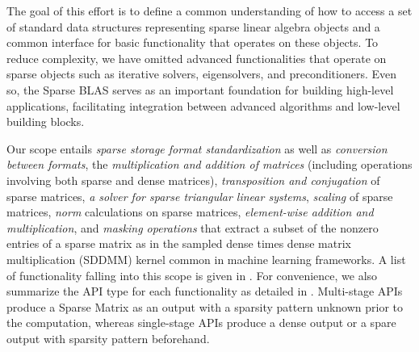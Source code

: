 \documentclass{article}
\begin{document}
The goal of this effort is to define a common understanding of how to access a set of standard data structures representing sparse linear algebra objects and a common interface for basic functionality that operates on these objects.
To reduce complexity, we have omitted advanced functionalities that operate on sparse objects such as iterative solvers, eigensolvers, and preconditioners. Even so, the Sparse BLAS serves as an important foundation for building high-level applications, facilitating integration between advanced algorithms and low-level building blocks.

Our scope entails \textit{sparse storage format standardization} as well as \textit{conversion between formats}, the \textit{multiplication and addition of matrices} (including operations involving both sparse and dense matrices), \textit{transposition and conjugation} of sparse matrices, \textit{a solver for sparse triangular linear systems}, \textit{scaling} of sparse matrices, \textit{norm} calculations on sparse matrices, \textit{element-wise addition and multiplication}, and \textit{masking operations} that extract a subset of the nonzero entries of a sparse matrix as in the sampled dense times dense matrix multiplication (SDDMM) kernel common in machine learning frameworks. A list of functionality falling into this scope is given in . For convenience, we also summarize the API type for each functionality as detailed in . Multi-stage APIs produce a Sparse Matrix as an output with a sparsity pattern unknown prior to the computation, whereas single-stage APIs produce a dense output or a spare output with sparsity pattern beforehand.
\end{document}
